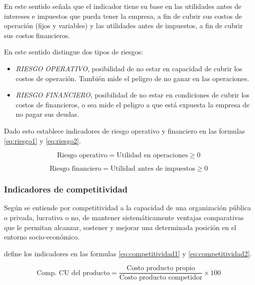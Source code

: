 En este sentido \cite{cruz} señala que el indicador tiene su base en las
utilidades antes de intereses e impuestos que pueda tener la empresa, a fin de
cubrir sus costos de operación (fijos y variables) y las utilidades antes de
impuestos, a fin de cubrir sus costos financieros.

En este sentido \cite{cruz} distingue dos tipos de riesgos:
\begin{itemize}
    \item \emph{RIESGO OPERATIVO}, posibilidad de no estar en capacidad de cubrir
          los costos de operación. También mide el peligro de no ganar en las
          operaciones.
    \item \emph{RIESGO FINANCIERO}, posibilidad de no estar en condiciones de
          cubrir los costos de financieros, o sea mide el peligro a que está
          expuesta la empresa de no pagar sus deudas.
\end{itemize}

Dado esto \cite{cruz} establece indicadores de riesgo operativo y financiero en las
formulas \ref{eq:riesgo1} y \ref{eq:riesgo2}.

\begin{equation}\label{eq:riesgo1}
    \text{Riesgo operativo} = \text{Utilidad en operaciones} \geq 0
\end{equation}

\begin{equation}\label{eq:riesgo2}
    \text{Riesgo financiero} = \text{Utilidad antes de impuestos} \geq 0
\end{equation}

\subsubsection{Indicadores de competitividad}
Según \cite{cruz} se entiende por competitividad a la capacidad de una organización
pública o privada, lucrativa o no, de mantener sistemáticamente ventajas comparativas
que le permitan alcanzar, sostener y mejorar una determinada posición en el entorno
socio-económico.

\cite{cruz} define los indicadores en las formulas \ref{eq:competitividad1} y
\ref{eq:competitividad2}.

\begin{equation}\label{eq:competitividad1}
    \text{Comp. CU del producto} = \frac{\text{Costo producto propio}}{\text{Costo producto competidor}} \times{100}
\end{equation}

